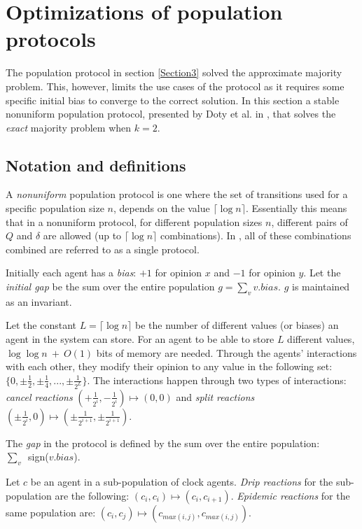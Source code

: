 \section{Optimizations of population protocols}
The population protocol in section \ref{Section3} solved the approximate majority problem. This, however, limits the use cases of the protocol as it requires some specific initial bias to converge to the correct solution.  In this section a stable nonuniform population protocol, presented by Doty et al. in \cite{dotyTimeSpaceOptimal2022}, that solves the \emph{exact} majority problem when $k = 2$. 

\subsection{Notation and definitions}

A \emph{nonuniform} population protocol is one where the set of transitions used for a specific population size $n$, depends on the value $\lceil \log n \rceil$. Essentially this means that in a nonuniform protocol, for different population sizes $n$, different pairs of $Q$ and $\delta$ are allowed (up to $\lceil \log n \rceil$ combinations). In \cite{dotyTimeSpaceOptimal2022}, all of these combinations combined are referred to as a single protocol. 

Initially each agent has a \emph{bias}: $+1$ for opinion $x$ and $-1$ for opinion $y$. Let the \emph{initial gap} be the sum over the entire population $g = \sum_v v.bias$. $g$ is maintained as an invariant. 

Let the constant $L = \lceil \log n \rceil$ be the number of different values (or biases) an agent in the system can store. For an agent to be able to store $L$ different values, $\log \log n \ + \ O(1)$ bits of memory are needed. Through the agents' interactions with each other, they modify their opinion to any value in the following set: $\{ 0, \pm \frac{1}{2}, \pm \frac{1}{4}, ...,  \pm \frac{1}{2^L} \}$. The interactions happen through two types of interactions: \emph{cancel reactions} $(+\frac{1}{2^i}, -\frac{1}{2^i}) \mapsto (0, 0)$ and \emph{split reactions} $(\pm \frac{1}{2^i}, 0) \mapsto (\pm \frac{1}{2^{i + 1}}, \pm \frac{1}{2^{i + 1}})$.

The \emph{gap} in the protocol is defined by the sum over the entire population: \\ \mbox{$\sum_v$ sign($v.bias$)}.

Let $c$ be an agent in a sub-population of clock agents. \emph{Drip reactions} for the sub-population are the following: $(c_i, c_i) \mapsto (c_i, c_{i + 1})$. \emph{Epidemic reactions} for the same population are: $(c_i, c_j) \mapsto (c_{max(i, j)}, c_{max(i, j)})$.

